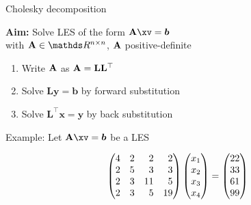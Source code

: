 



\newcommand{\xdownarrow}[1]{%
  {\left\downarrow\vbox to #1{}\right.\kern-\nulldelimiterspace}
}

\newcommand{\grey}[1]{\textcolor{grey}{#1}}
\newcommand{\red}[1]{\textcolor{red}{#1}}










\begin{vbframe}{Cholesky decomposition}

\textbf{Aim:} Solve LES of the form $\Amat \xv = \boldsymbol{b}$\\
\medskip
with $\Amat \in \R^{n \times n}$, $\mathbf{A}$ positive-definite
\medskip
\begin{enumerate}
\item Write $\mathbf{A}$ as $\mathbf{A} = \mathbf{L}\mathbf{L}^\top$\\
\item Solve $\mathbf{Ly} = \mathbf{b}$ by forward substitution
\item Solve $\mathbf{L}^\top \mathbf{x}=\mathbf{y}$ by back substitution
\framebreak
\end{enumerate}

Example:
Let $\Amat \xv = \boldsymbol{b}$ be a LES

$$
\begin{pmatrix*}[r]
4 & 2 & 2 & 2\\
2 & 5 & 3 & 3 \\
2 & 3 & 11&5\\
2 & 3 & 5 & 19\end{pmatrix*}
\mat{
x_1 \\ x_2 \\ x_3\\ x_4
\end{pmatrix} = \begin{pmatrix}
22 \\ 33 \\ 61 \\ 99 }
$$

\end{vbframe}

